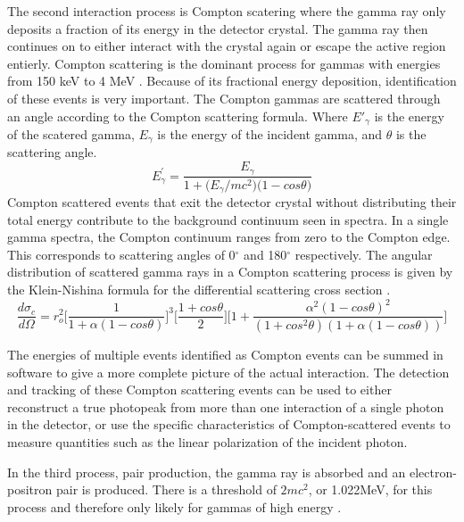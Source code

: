 \indent The second interaction process is Compton scatering where the gamma ray only deposits a fraction of its energy in the detector crystal. The gamma ray then continues on to either interact with the crystal again or escape the active region entierly. Compton scattering is the dominant process for gammas with energies from 150 keV to 4 MeV \cite{KK88}. Because of its fractional energy deposition, identification of these events is very important. The Compton gammas are scattered through an angle according to the Compton scattering formula. Where $E'_\gamma$ is the energy of the scatered gamma, $E_\gamma$ is the energy of the incident gamma, and $\theta$ is the scattering angle. 
\begin{equation}
E^\prime_\gamma = \frac{E_\gamma}{1 + \big(E_\gamma/mc^2\big)\big(1-cos\theta\big)}
\end{equation}
Compton scattered events that exit the detector crystal without distributing their total energy contribute to the background continuum seen in spectra. In a single gamma spectra, the Compton continuum ranges from zero to the Compton edge. This corresponds to scattering angles of 0$^\circ$ and 180$^\circ$ respectively. The angular distribution of scattered gamma rays in a Compton scattering process is given by the Klein-Nishina formula for the differential scattering cross section \cite{KK88}.
\begin{equation}
\frac{d\sigma_c}{d\Omega}=r_o^2\bigg[\frac{1}{1+\alpha(1-cos\theta)}\bigg]^3\bigg[\frac{1+cos\theta}{2}\bigg]\bigg[1+\frac{\alpha^2(1-cos\theta)^2}{(1+cos^2\theta)(1+\alpha(1-cos\theta))}\bigg]
\end{equation}

The energies of multiple events identified as Compton events can be summed in software to give a more complete picture of the actual interaction.  The detection and tracking of these Compton scattering events can be used to either reconstruct a true photopeak from more than one interaction of a single photon in the detector, or use the specific characteristics of Compton-scattered events to measure quantities such as the linear polarization of the incident photon. 

In the third process, pair production, the gamma ray is absorbed and an electron-positron pair is produced. There is a threshold of $2mc^2$, or 1.022MeV, for this process and therefore only likely for gammas of high energy \cite{KK88}.

